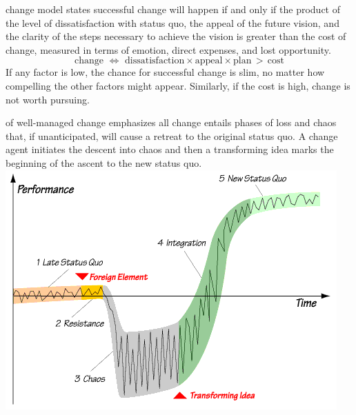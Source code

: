 \documentclass{tufte-handout}
\begin{document}
\maketitle

 change model\cite{Beckhard1987}
states successful change will happen if and only if the product of the
level of dissatisfaction with status quo, the appeal of the future
vision, and the clarity of the steps necessary to achieve the vision is
greater than the cost of change, measured in terms of emotion, direct
expenses, and lost opportunity.
\begin{displaymath}
  \text{change}
  \,\,\iff\,\,
  \text{dissatisfaction}\times\text{appeal}\times\text{plan}
  \,>\,
  \text{cost}
\end{displaymath}
If any factor is low, the chance for successful change is slim, no matter
how compelling the other factors might appear.
Similarly, if the cost is high, change is not worth pursuing.

 of well-managed
change\cite{Satir1991}\cite{Weinberg1997}\cite{Beckhard1987}
emphasizes all change entails phases of loss and chaos that, if
unanticipated, will cause a retreat to the original status quo.
A change agent initiates the descent into chaos and then a transforming
idea marks the beginning of the ascent to the new status quo.
\includegraphics{satir_graph}

\newpage
\end{document}
